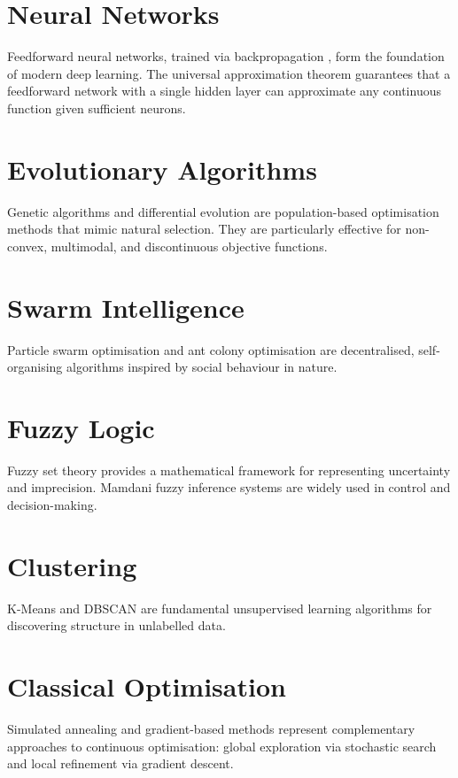 \documentclass[12pt,a4paper,twoside]{report}
\begin{document}
\section{Neural Networks}
Feedforward neural networks, trained via backpropagation
\citep{rumelhart1986learning}, form the foundation of modern deep learning.
The universal approximation theorem \citep{hornik1989multilayer} guarantees
that a feedforward network with a single hidden layer can approximate any
continuous function given sufficient neurons.

\section{Evolutionary Algorithms}
Genetic algorithms \citep{holland1975adaptation} and differential evolution
\citep{storn1997differential} are population-based optimisation methods that
mimic natural selection. They are particularly effective for non-convex,
multimodal, and discontinuous objective functions.

\section{Swarm Intelligence}
Particle swarm optimisation \citep{kennedy1995pso} and ant colony optimisation
\citep{dorigo1996antsystem} are decentralised, self-organising algorithms
inspired by social behaviour in nature.

\section{Fuzzy Logic}
Fuzzy set theory \citep{zadeh1965fuzzy} provides a mathematical framework
for representing uncertainty and imprecision. Mamdani fuzzy inference systems
\citep{mamdani1975experiment} are widely used in control and decision-making.

\section{Clustering}
K-Means \citep{lloyd1982least} and DBSCAN \citep{ester1996dbscan} are
fundamental unsupervised learning algorithms for discovering structure in
unlabelled data.

\section{Classical Optimisation}
Simulated annealing \citep{kirkpatrick1983optimization} and gradient-based
methods \citep{kingma2015adam} represent complementary approaches to
continuous optimisation: global exploration via stochastic search and local
refinement via gradient descent.
\end{document}
